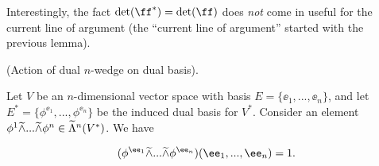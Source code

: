 \begin{remark}
    Interestingly, the fact $\det(\ff^*) = \det(\ff)$ does \textit{not} come in useful for the current line of argument (the ``current line of argument'' started with the previous lemma).
\end{remark}

\begin{lemma}
\label{ch::exterior_pwrs::lemma::action_dual_wedge_dual_basis}
    (Action of dual $n$-wedge on dual basis).
    
    Let $V$ be an $n$-dimensional vector space with basis $E = \{\ee_1, ..., \ee_n\}$, and let $E^* = \{\phi^{\ee_1}, ..., \phi^{\ee_n}\}$ be the induced dual basis for $V^*$. Consider an element $\phi^1 \widetilde{\wedge} ... \widetilde{\wedge} \phi^n \in \widetilde{\Lambda}^n(V^*)$. We have
    
    \begin{align*}
        (\phi^{\ee_1} \twedge ... \twedge \phi^{\ee_n})(\ee_1, ..., \ee_n) = 1.
    \end{align*} 
\end{lemma}

